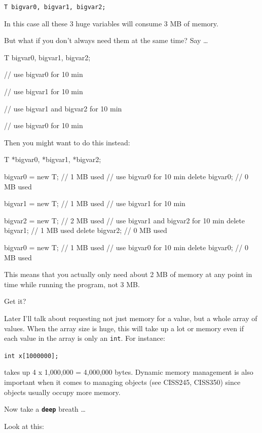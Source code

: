 \begin{center}
\texttt{T bigvar0, bigvar1, bigvar2;}
\end{center}

In this case all these 3 huge variables will consume 3 MB of memory.

But what if you don't always need them at the same time? Say \ldots

\begin{consolethree}[escapeinside=||]
T bigvar0, bigvar1, bigvar2;

// use bigvar0 for 10 min

// use bigvar1 for 10 min

// use bigvar1 and bigvar2 for 10 min

// use bigvar0 for 10 min 
\end{consolethree}
Then you might want to do this instead:

\begin{consolethree}[escapeinside=||]
T *bigvar0, *bigvar1, *bigvar2;

bigvar0 = new T; // 1 MB used
// use bigvar0 for 10 min
delete bigvar0; // 0 MB used

bigvar1 = new T; // 1 MB used
// use bigvar1 for 10 min

bigvar2 = new T; // 2 MB used
// use bigvar1 and bigvar2 for 10 min
delete bigvar1; // 1 MB used
delete bigvar2; // 0 MB used

bigvar0 = new T; // 1 MB used
// use bigvar0 for 10 min
delete bigvar0; // 0 MB used
\end{consolethree}
This means that you actually only need about 2 MB of memory at any point
in time while running the program, not 3 MB.

Get it?

Later I'll talk about requesting not just memory for a value, but a whole array of values. When the array size is huge, this will take up a lot or memory even if each value in the array is only an \texttt{int}. For instance:

\texttt{int x[1000000];}

takes up 4 x 1,000,000 = 4,000,000 bytes. Dynamic memory management is also important when it comes to managing objects (see CISS245, CISS350) since objects usually occupy more memory.

\newpage{}

Now take a \texttt{\textbf{deep}} breath \ldots

Look at this:

